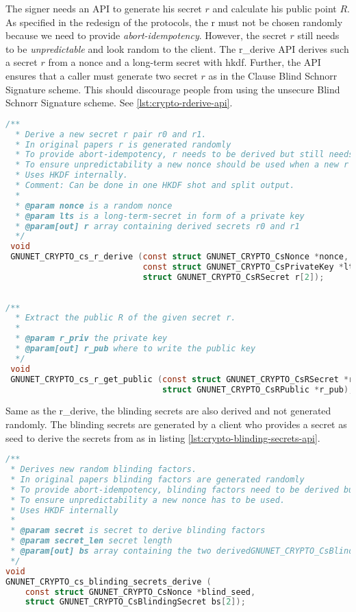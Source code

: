 The signer needs an API to generate his secret $r$ and calculate his public point $R$.
As specified in the redesign of the protocols, the r must not be chosen randomly because we need to provide \textit{\gls{abort-idempotency}}. However, the secret $r$ still needs to be \textit{unpredictable} and look random to the client.
The r\_derive API derives such a secret $r$ from a nonce and a long-term secret with \gls{hkdf}.
Further, the API ensures that a caller must generate two secret $r$ as in the Clause Blind Schnorr Signature scheme. This should discourage people from using the unsecure Blind Schnorr Signature scheme. See \ref{lst:crypto-rderive-api}.


\begin{lstlisting}[style=bfh-c,language=C, caption={GNUnet r derive API}, label={lst:crypto-rderive-api}]
 /**
  * Derive a new secret r pair r0 and r1.
  * In original papers r is generated randomly
  * To provide abort-idempotency, r needs to be derived but still needs to be UNPREDICTABLE
  * To ensure unpredictability a new nonce should be used when a new r needs to be derived.
  * Uses HKDF internally.
  * Comment: Can be done in one HKDF shot and split output.
  * 
  * @param nonce is a random nonce
  * @param lts is a long-term-secret in form of a private key
  * @param[out] r array containing derived secrets r0 and r1
  */
 void
 GNUNET_CRYPTO_cs_r_derive (const struct GNUNET_CRYPTO_CsNonce *nonce,
                            const struct GNUNET_CRYPTO_CsPrivateKey *lts,
                            struct GNUNET_CRYPTO_CsRSecret r[2]);
 
 
/**
  * Extract the public R of the given secret r.
  *
  * @param r_priv the private key
  * @param[out] r_pub where to write the public key
  */
 void
 GNUNET_CRYPTO_cs_r_get_public (const struct GNUNET_CRYPTO_CsRSecret *r_priv,
                                struct GNUNET_CRYPTO_CsRPublic *r_pub);
\end{lstlisting}


Same as the r\_derive, the blinding secrets are also derived and not generated randomly.
The blinding secrets are generated by a client who provides a secret as seed to derive the secrets from as in listing \ref{lst:crypto-blinding-secrets-api}.

\begin{lstlisting}[style=bfh-c,language=C, caption={GNUnet blinding secrets derive API}, label={lst:crypto-blinding-secrets-api}]
/**
 * Derives new random blinding factors.
 * In original papers blinding factors are generated randomly
 * To provide abort-idempotency, blinding factors need to be derived but still need to be UNPREDICTABLE
 * To ensure unpredictability a new nonce has to be used.
 * Uses HKDF internally
 * 
 * @param secret is secret to derive blinding factors
 * @param secret_len secret length
 * @param[out] bs array containing the two derivedGNUNET_CRYPTO_CsBlindingSecret
 */
void
GNUNET_CRYPTO_cs_blinding_secrets_derive (
    const struct GNUNET_CRYPTO_CsNonce *blind_seed,
    struct GNUNET_CRYPTO_CsBlindingSecret bs[2]);
\end{lstlisting}

